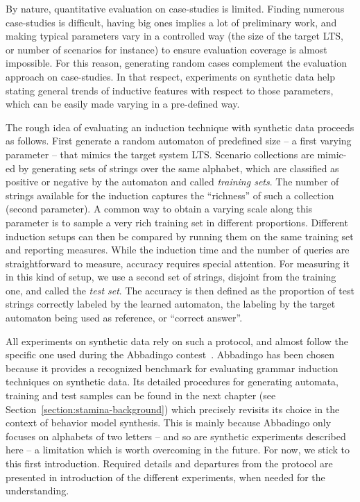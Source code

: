 By nature, quantitative evaluation on case-studies is limited. Finding numerous case-studies is difficult, having big ones implies a lot of preliminary work, and making typical parameters vary in a controlled way (the size of the target LTS, or number of scenarios for instance) to ensure evaluation coverage is almost impossible. For this reason, generating random cases complement the evaluation approach on case-studies. In that respect, experiments on synthetic data help stating general trends of inductive features with respect to those parameters, which can be easily made varying in a pre-defined way.

The rough idea of evaluating an induction technique with synthetic data proceeds as follows. First generate a random automaton of predefined size -- a first varying parameter -- that mimics the target system LTS. Scenario collections are mimic-ed by generating sets of strings over the same alphabet, which are classified as positive or negative by the automaton and called \emph{training sets}. The number of strings available for the induction captures the ``richness'' of such a collection (second parameter). A common way to obtain a varying scale along this parameter is to sample a very rich training set in different proportions. Different induction setups can then be compared by running them on the same training set and reporting measures. While the induction time and the number of queries are straightforward to measure, accuracy requires special attention. For measuring it in this kind of setup, we use a second set of strings, disjoint from the training one, and called the \emph{test set}. The accuracy is then defined as the proportion of test strings correctly labeled by the learned automaton, the labeling by the target automaton being used as reference, or ``correct answer''. 

All experiments on synthetic data rely on such a protocol, and almost follow the specific one used during the Abbadingo contest~\cite{Lang:1998}. Abbadingo has been chosen because it provides a recognized benchmark for evaluating grammar induction techniques on synthetic data. Its detailed procedures for generating automata, training and test samples can be found in the next chapter (see Section~\ref{section:stamina-background}) which precisely revisits its choice in the context of behavior model synthesis. This is mainly because Abbadingo only focuses on alphabets of two letters -- and so are synthetic experiments described here -- a limitation which is worth overcoming in the future. For now, we stick to this first introduction. Required details and departures from the protocol are presented in introduction of the different experiments, when needed for the understanding.

